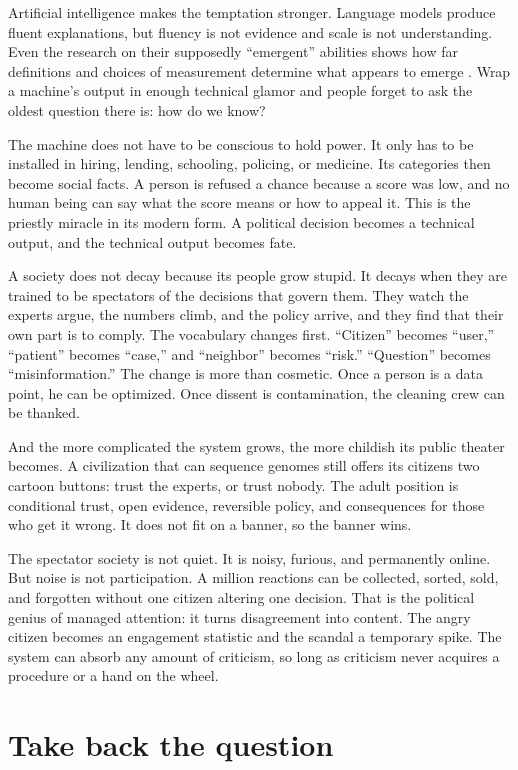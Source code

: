 \documentclass[12pt,a4paper]{book}
\begin{document}
Artificial intelligence makes the temptation stronger. Language models produce fluent explanations, but fluency is not evidence and scale is not understanding. Even the research on their supposedly ``emergent'' abilities shows how far definitions and choices of measurement determine what appears to emerge \cite{Wei2022Jun}. Wrap a machine's output in enough technical glamor and people forget to ask the oldest question there is: how do we know?

The machine does not have to be conscious to hold power. It only has to be installed in hiring, lending, schooling, policing, or medicine. Its categories then become social facts. A person is refused a chance because a score was low, and no human being can say what the score means or how to appeal it. This is the priestly miracle in its modern form. A political decision becomes a technical output, and the technical output becomes fate.

A society does not decay because its people grow stupid. It decays when they are trained to be spectators of the decisions that govern them. They watch the experts argue, the numbers climb, and the policy arrive, and they find that their own part is to comply. The vocabulary changes first. ``Citizen'' becomes ``user,'' ``patient'' becomes ``case,'' and ``neighbor'' becomes ``risk.'' ``Question'' becomes ``misinformation.'' The change is more than cosmetic. Once a person is a data point, he can be optimized. Once dissent is contamination, the cleaning crew can be thanked.

And the more complicated the system grows, the more childish its public theater becomes. A civilization that can sequence genomes still offers its citizens two cartoon buttons: trust the experts, or trust nobody. The adult position is conditional trust, open evidence, reversible policy, and consequences for those who get it wrong. It does not fit on a banner, so the banner wins.

The spectator society is not quiet. It is noisy, furious, and permanently online. But noise is not participation. A million reactions can be collected, sorted, sold, and forgotten without one citizen altering one decision. That is the political genius of managed attention: it turns disagreement into content. The angry citizen becomes an engagement statistic and the scandal a temporary spike. The system can absorb any amount of criticism, so long as criticism never acquires a procedure or a hand on the wheel.

\section{Take back the question}
\end{document}
